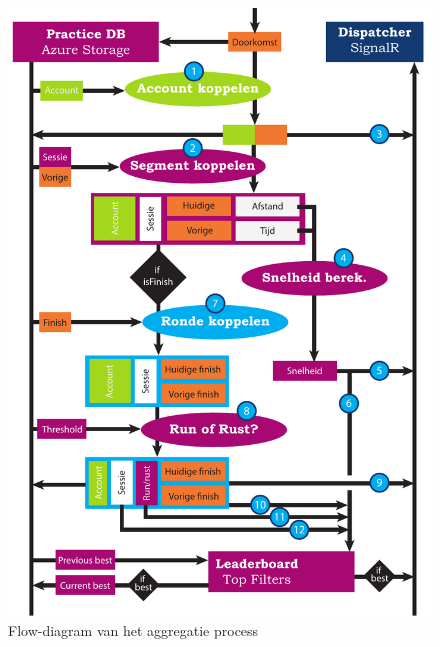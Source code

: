 \begin{figure}[ht]
  \begin{center}
    \includegraphics[width=\textwidth]{style/images/Aggregatie-flow}
  \end{center}
  \label{fig:aggregatie-flow}
  \caption{Flow-diagram van het aggregatie process}
\end{figure}

